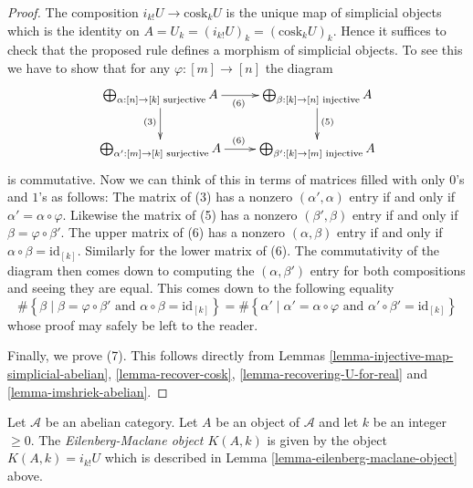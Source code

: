 \begin{proof}
\medskip\noindent
The composition $i_{k!}U \to \text{cosk}_kU$ is the
unique map of simplicial objects which is
the identity on $A = U_k = (i_{k!}U)_k = (\text{cosk}_kU)_k$.
Hence it suffices to check that the proposed rule defines
a morphism of simplicial objects.
To see this we have to show that
for any $\varphi : [m] \to [n]$ the diagram
$$
\xymatrix{
\bigoplus_{\alpha : [n] \to [k]\text{ surjective}} A
\ar[d]_{(3)}
\ar[r]_{(6)}
&
\bigoplus_{\beta : [k] \to [n]\text{ injective}} A
\ar[d]^{(5)}
\\
\bigoplus_{\alpha' : [m] \to [k]\text{ surjective}} A
\ar[r]^{(6)}
&
\bigoplus_{\beta' : [k] \to [m]\text{ injective}} A
}
$$
is commutative. Now we can think of this in terms of
matrices filled with only $0$'s and $1$'s as follows:
The matrix of (3) has a nonzero
$(\alpha', \alpha)$ entry if and only if
$\alpha' = \alpha \circ \varphi$. Likewise
the matrix of (5) has a nonzero
$(\beta', \beta)$ entry if and only if
$\beta = \varphi \circ \beta'$. The upper matrix
of (6) has a nonzero $(\alpha, \beta)$ entry if and only if
$\alpha \circ \beta = \text{id}_{[k]}$. Similarly for the
lower matrix of (6). The commutativity of the
diagram then comes down to computing the
$(\alpha, \beta')$ entry for both compositions
and seeing they are equal. This comes down to the
following equality
$$
\# \left\{
\beta
\mid
\beta = \varphi \circ \beta'
\text{ and }
\alpha \circ \beta = \text{id}_{[k]}
\right\}
=
\# \left\{
\alpha'
\mid
\alpha' = \alpha \circ \varphi
\text{ and }
\alpha' \circ \beta' = \text{id}_{[k]}
\right\}
$$
whose proof may safely be left to the reader.

\medskip\noindent
Finally, we prove (7). This follows directly from
Lemmas \ref{lemma-injective-map-simplicial-abelian},
\ref{lemma-recover-cosk}, \ref{lemma-recovering-U-for-real}
and \ref{lemma-imshriek-abelian}.
\end{proof}

\begin{definition}
\label{definition-eilenberg-maclane}
Let $\mathcal{A}$ be an abelian category.
Let $A$ be an object of $\mathcal{A}$ and
let $k$ be an integer $\geq 0$.
The {\it Eilenberg-Maclane object $K(A, k)$}
is given by the object $K(A, k) = i_{k!}U$
which is described in
Lemma \ref{lemma-eilenberg-maclane-object} above.
\end{definition}


